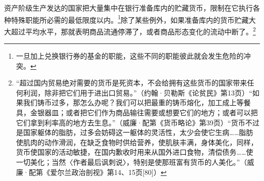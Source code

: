 \documentclass{ctexbook}
\begin{document}
        资产阶级生产发达的国家把大量集中在银行准备库内的贮藏货币，限制在它执行各种特殊职能所必需的最低限度以内。\footnote{一旦加上兑换银行券的基金的职能，这些不同的职能彼此就会发生危险的冲突。}除了某些例外，如果准备库内的货币贮藏大大超过平均水平，那就表明商品流通停滞了，或者商品形态变化的流动中断了。\footnote{“超过国内贸易绝对需要的货币是死资本，不会给拥有这些货币的国家带来任何利润，除非把它们用于进出口贸易。”（约翰·贝勒斯《论贫民》第13页）“如果我们铸币过多，那怎么办呢？我们可以把最重的铸币熔化，加工成上等餐具，金银器皿；或者把它们作为商品输往需要或想要它们的地方；或者可以把它们拿到利率高的地方去生息。”（威廉·配第《货币略论》第39页）“货币不过是国家躯体的脂肪，过多会妨碍这一躯体的灵活性，太少会使它生病……脂肪使肌肉的动作滑润，在缺乏食物时供给营养，使肌肤丰满，身体美化，同样，货币使国家的活动敏捷，在国内歉收时用来从国外进口食物，清偿债务……使一切美化；当然〈作者最后讽刺说〉，特别是使那班富有货币的人美化。”（威廉·配第《爱尔兰政治剖视》第14、15页[80]）}

\theendnotes 
\end{document}
